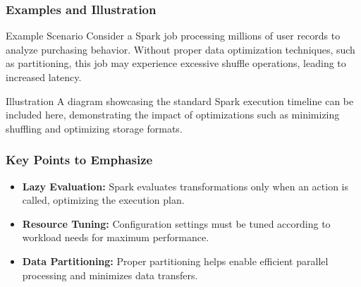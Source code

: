 \documentclass[aspectratio=169]{beamer}
\begin{document}
\begin{frame}[fragile]
    \frametitle{Examples and Illustration}
    
    \begin{block}{Example Scenario}
        Consider a Spark job processing millions of user records to analyze purchasing behavior. 
        Without proper data optimization techniques, such as partitioning, this job may experience 
        excessive shuffle operations, leading to increased latency.
    \end{block}
    
    \begin{block}{Illustration}
        A diagram showcasing the standard Spark execution timeline can be included here, demonstrating 
        the impact of optimizations such as minimizing shuffling and optimizing storage formats.
    \end{block}
\end{frame}

\begin{frame}[fragile]
    \frametitle{Key Points to Emphasize}
    
    \begin{itemize}
        \item \textbf{Lazy Evaluation:} Spark evaluates transformations only when an action is called, optimizing the execution plan.
        \item \textbf{Resource Tuning:} Configuration settings must be tuned according to workload needs for maximum performance.
        \item \textbf{Data Partitioning:} Proper partitioning helps enable efficient parallel processing and minimizes data transfers.
    \end{itemize}
\end{frame}
\end{document}
